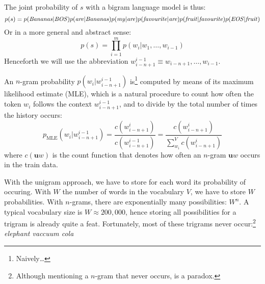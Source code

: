 The joint probability of $s$ with a bigram language model is thus:
\[ p(s) = p(\textnormal{\emph{Bananas}}|\textnormal{\emph{BOS}})p(\textnormal{\emph{are}}|\textnormal{\emph{Bananas}})p(\textnormal{\emph{my}}|\textnormal{\emph{are}})p(\textnormal{\emph{favourite}}|\textnormal{\emph{are}})p(\textnormal{\emph{fruit}}|\textnormal{\emph{favourite}})p(\textnormal{\emph{EOS}}|\textnormal{\emph{fruit}})\]
Or in a more general and abstract sense:
\[ p(s) = \prod_{i=1}^mp(w_i|w_1,\ldots,w_{i-1}) \]
Henceforth we will use the abbreviation $w_{i-n+1}^{i-1} \equiv w_{i-n+1},\ldots,w_{i-1}$.

An $n$-gram probability $p(w_i|w_{i-n+1}^{i-1})$ is\footnote{Naively\ldots} computed by means of its maximum likelihood estimate (MLE), which is a natural procedure to count how often the token $w_i$ follows the context $w_{i-n+1}^{i-1}$, and to divide by the total number of times the history occurs:
\begin{equation} p_{\operatorname{MLE}}\left(w_i|w_{i-n+1}^{i-1}\right) = \frac{c\left(w_{i-n+1}^i\right)}{c\left(w_{i-n+1}^{i-1}\right)} = \frac{c\left(w_{i-n+1}^{i}\right)}{\sum_{w_i}^{V}c\left(w_{i-n+1}^{i}\right)}\label{eq:pmle}
\end{equation}
where $c(\mathbf{u}w)$ is the count function that denotes how often an $n$-gram $\mathbf{u}w$ occurs in the train data.

With the unigram approach, we have to store for each word its probability of occuring. With $W$ the number of words in the vocabulary $V$, we have to store $W$ probabilities. With $n$-grams, there are exponentially many possibilities: $W^n$. A typical vocabulary size is $W\approx 200,000$, hence storing all possibilities for a trigram is already quite a feat. Fortunately, most of these trigrams never occur:\footnote{Although mentioning a $n$-gram that never occurs, is a paradox.} \emph{elephant vaccuum cola}





